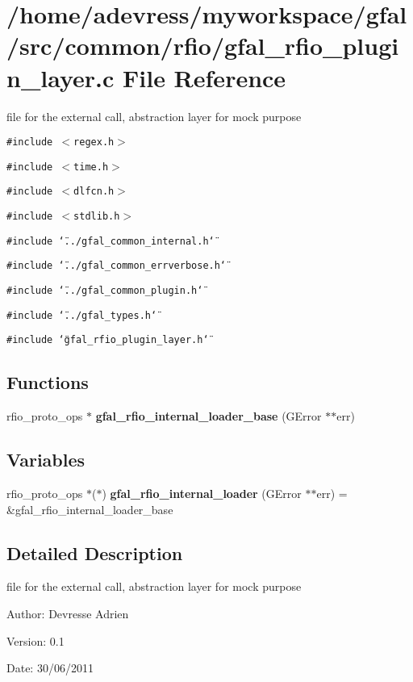 \section{/home/adevress/myworkspace/gfal/src/common/rfio/gfal\_\-rfio\_\-plugin\_\-layer.c File Reference}
\label{gfal__rfio__plugin__layer_8c}
file for the external call, abstraction layer for mock purpose 

{\tt \#include $<$regex.h$>$}\par
{\tt \#include $<$time.h$>$}\par
{\tt \#include $<$dlfcn.h$>$}\par
{\tt \#include $<$stdlib.h$>$}\par
{\tt \#include \char`\"{}../gfal\_\-common\_\-internal.h\char`\"{}}\par
{\tt \#include \char`\"{}../gfal\_\-common\_\-errverbose.h\char`\"{}}\par
{\tt \#include \char`\"{}../gfal\_\-common\_\-plugin.h\char`\"{}}\par
{\tt \#include \char`\"{}../gfal\_\-types.h\char`\"{}}\par
{\tt \#include \char`\"{}gfal\_\-rfio\_\-plugin\_\-layer.h\char`\"{}}\par
\subsection*{Functions}
\begin{CompactItemize}
\item 
rfio\_\-proto\_\-ops $\ast$ \textbf{gfal\_\-rfio\_\-internal\_\-loader\_\-base} (GError $\ast$$\ast$err)\label{gfal__rfio__plugin__layer_8c_6c40bba38f2b638d298d27a8d8cdb5bf}

\end{CompactItemize}
\subsection*{Variables}
\begin{CompactItemize}
\item 
rfio\_\-proto\_\-ops $\ast$($\ast$) \textbf{gfal\_\-rfio\_\-internal\_\-loader} (GError $\ast$$\ast$err) = \&gfal\_\-rfio\_\-internal\_\-loader\_\-base\label{gfal__rfio__plugin__layer_8c_6c17e62821e2194325693771c626b7bb}

\end{CompactItemize}


\subsection{Detailed Description}
file for the external call, abstraction layer for mock purpose 

\begin{Desc}
\item[Author:]Devresse Adrien \end{Desc}
\begin{Desc}
\item[Version:]0.1 \end{Desc}
\begin{Desc}
\item[Date:]30/06/2011 \end{Desc}
